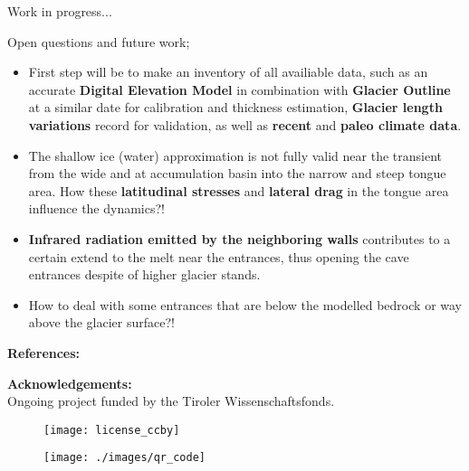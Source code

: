 \documentclass[final]{beamer}
\begin{document}
\begin{frame}[fragile]
\begin{columns}[t]
\begin{rightcolumn}
\begin{boxblock}{Work in progress...}
   \end{boxblock}

   \begin{boxblock}{Open questions and future work;}
    \begin{itemize}
      \item First step will be to make an inventory of all availiable data, such as an accurate \textbf{Digital Elevation Model} in combination with \textbf{Glacier Outline} at a similar date for calibration and thickness estimation, \textbf{Glacier length variations} record for validation, as well as \textbf{recent} and \textbf{paleo climate data}.
      \item The shallow ice (water) approximation is not fully valid near the transient from the wide and at accumulation basin into the narrow and steep tongue area. How these \textbf{latitudinal stresses} and \textbf{lateral drag} in the tongue area influence the dynamics?!
      \item \textbf{Infrared radiation emitted by the neighboring walls} contributes to a certain extend to the melt near the entrances, thus opening the cave entrances despite of higher glacier stands. 
      \item How to deal with some entrances that are below the modelled bedrock or way above the glacier surface?!
    \end{itemize}
   \end{boxblock}

   \begin{footnotesize}
   
   \vspace{0.3cm}
   \begin{minipage}[t]{0.75\textwidth}
      \textbf{References:} \\
      
      

      \vspace{1cm}
   
      \textbf{Acknowledgements:} \\
        Ongoing project funded by the Tiroler Wissenschaftsfonds. %
   \end{minipage}
   \hfill
   \begin{minipage}[t]{0.12\textwidth}
      \begin{figure}
         \texttt{[image: license\_ccby]}
         \vspace{5mm}
   
         \texttt{[image: ./images/qr\_code]} \\
      \end{figure}
   \end{minipage}
   \end{footnotesize}

\end{rightcolumn}

\end{columns}
\end{frame}
\end{document}
